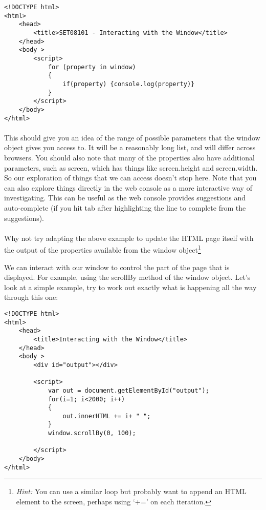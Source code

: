 \documentclass[10pt, a4paper]{article}
\begin{document}
\begin{lstlisting}
<!DOCTYPE html>
<html>
    <head>
        <title>SET08101 - Interacting with the Window</title>
    </head>
    <body >
        <script>
            for (property in window)
            {
                if(property) {console.log(property)}
            }
        </script>
    </body>
</html>
\end{lstlisting}

\paragraph{} This should give you an idea of the range of possible parameters that the window object gives you access to. It will be a reasonably long list, and will differ across browsers. You should also note that many of the properties also have additional parameters, such as screen, which has things like screen.height and screen.width. So our exploration of things that we can access doesn't stop here. Note that you can also explore things directly in the web console as a more interactive way of investigating. This can be useful as the web console provides suggestions and auto-complete (if you hit tab after highlighting the line to complete from the suggestions).

\paragraph{} Why not try adapting the above example to update the HTML page itself with the output of the properties available from the window object\footnote{\emph{Hint:} You can use a similar loop but probably want to append an HTML element to the screen, perhaps using `+=' on each iteration.}

We can interact with our window to control the part of the page that is displayed. For example, using the scrollBy method of the window object. Let's look at a simple example, try to work out exactly what is happening all the way through this one:

\begin{lstlisting}
<!DOCTYPE html>
<html>
    <head>
        <title>Interacting with the Window</title>
    </head>
    <body >
        <div id="output"></div>

        <script>
            var out = document.getElementById("output");
            for(i=1; i<2000; i++)
            {
                out.innerHTML += i+ " ";
            }
            window.scrollBy(0, 100);
            
        </script>
    </body>
</html>
\end{lstlisting}
\end{document}
